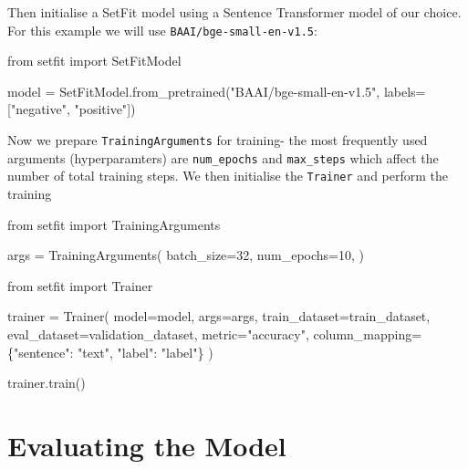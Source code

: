\documentclass[
  letterpaper,
  DIV=11,
  numbers=noendperiod]{scrreprt}
\newenvironment{Shaded}{\begin{snugshade}}{\end{snugshade}}
\newcommand{\DecValTok}[1]{\textcolor[rgb]{0.68,0.00,0.00}{#1}}
\newcommand{\ImportTok}[1]{\textcolor[rgb]{0.00,0.46,0.62}{#1}}
\newcommand{\NormalTok}[1]{\textcolor[rgb]{0.00,0.23,0.31}{#1}}
\newcommand{\OperatorTok}[1]{\textcolor[rgb]{0.37,0.37,0.37}{#1}}
\newcommand{\StringTok}[1]{\textcolor[rgb]{0.13,0.47,0.30}{#1}}
\begin{document}
Then initialise a SetFit model using a Sentence Transformer model of our
choice. For this example we will use \texttt{BAAI/bge-small-en-v1.5}:

\begin{Shaded}
\begin{Highlighting}[]
\ImportTok{from}\NormalTok{ setfit }\ImportTok{import}\NormalTok{ SetFitModel}

\NormalTok{model }\OperatorTok{=}\NormalTok{ SetFitModel.from\_pretrained(}\StringTok{"BAAI/bge{-}small{-}en{-}v1.5"}\NormalTok{,}
\NormalTok{labels}\OperatorTok{=}\NormalTok{[}\StringTok{"negative"}\NormalTok{, }\StringTok{"positive"}\NormalTok{])}
\end{Highlighting}
\end{Shaded}

Now we prepare \texttt{TrainingArguments} for training- the most
frequently used arguments (hyperparamters) are \texttt{num\_epochs} and
\texttt{max\_steps} which affect the number of total training steps. We
then initialise the \texttt{Trainer} and perform the training

\begin{Shaded}
\begin{Highlighting}[]
\ImportTok{from}\NormalTok{ setfit }\ImportTok{import}\NormalTok{ TrainingArguments}

\NormalTok{args }\OperatorTok{=}\NormalTok{ TrainingArguments(}
\NormalTok{    batch\_size}\OperatorTok{=}\DecValTok{32}\NormalTok{,}
\NormalTok{    num\_epochs}\OperatorTok{=}\DecValTok{10}\NormalTok{,}
\NormalTok{)}

\ImportTok{from}\NormalTok{ setfit }\ImportTok{import}\NormalTok{ Trainer}

\NormalTok{trainer }\OperatorTok{=}\NormalTok{ Trainer(}
\NormalTok{    model}\OperatorTok{=}\NormalTok{model,}
\NormalTok{    args}\OperatorTok{=}\NormalTok{args,}
\NormalTok{    train\_dataset}\OperatorTok{=}\NormalTok{train\_dataset,}
\NormalTok{    eval\_dataset}\OperatorTok{=}\NormalTok{validation\_dataset,}
\NormalTok{    metric}\OperatorTok{=}\StringTok{"accuracy"}\NormalTok{,}
\NormalTok{    column\_mapping}\OperatorTok{=}\NormalTok{\{}\StringTok{"sentence"}\NormalTok{: }\StringTok{"text"}\NormalTok{, }\StringTok{"label"}\NormalTok{: }\StringTok{"label"}\NormalTok{\}}
\NormalTok{)}

\NormalTok{trainer.train()}
\end{Highlighting}
\end{Shaded}

\section{Evaluating the Model}\label{evaluating-the-model-1}
\end{document}
